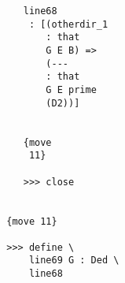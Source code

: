 \documentclass[12pt]{article}
\begin{document}
\begin{verbatim}
                                    line68 
                                     : [(otherdir_1 
                                        : that 
                                        G E B) => 
                                        (--- 
                                        : that 
                                        G E prime 
                                        (D2))]


                                    {move 
                                     11}

                                    >>> close


                                 {move 11}

                                 >>> define \
                                     line69 G : Ded \
                                     line68



\end{verbatim}
\end{document}
